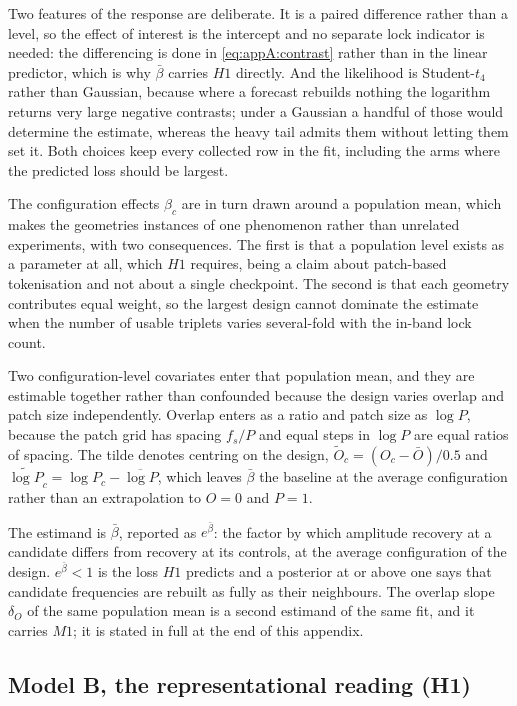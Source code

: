 Two features of the response are deliberate. It is a paired difference rather than a level, so the effect of interest is the intercept and no separate lock indicator is needed: the differencing is done in \autoref{eq:appA:contrast} rather than in the linear predictor, which is why $\bar\beta$ carries $H1$ directly. And the likelihood is Student-$t_4$ rather than Gaussian, because where a forecast rebuilds nothing the logarithm returns very large negative contrasts; under a Gaussian a handful of those would determine the estimate, whereas the heavy tail admits them without letting them set it. Both choices keep every collected row in the fit, including the arms where the predicted loss should be largest.

The configuration effects $\beta_c$ are in turn drawn around a population mean, which makes the geometries instances of one phenomenon rather than unrelated experiments, with two consequences. The first is that a population level exists as a parameter at all, which $H1$ requires, being a claim about patch-based tokenisation and not about a single checkpoint. The second is that each geometry contributes equal weight, so the largest design cannot dominate the estimate when the number of usable triplets varies several-fold with the in-band lock count.

Two configuration-level covariates enter that population mean, and they are estimable together rather than confounded because the design varies overlap and patch size independently. Overlap enters as a ratio and patch size as $\log P$, because the patch grid has spacing $f_s/P$ and equal steps in $\log P$ are equal ratios of spacing. The tilde denotes centring on the design, $\widetilde O_c=(O_c-\bar O)/0.5$ and $\widetilde{\log P}_c=\log P_c-\overline{\log P}$, which leaves $\bar\beta$ the baseline at the average configuration rather than an extrapolation to $O=0$ and $P=1$.

The estimand is $\bar\beta$, reported as $e^{\bar\beta}$: the factor by which amplitude recovery at a candidate differs from recovery at its controls, at the average configuration of the design. $e^{\bar\beta}<1$ is the loss $H1$ predicts and a posterior at or above one says that candidate frequencies are rebuilt as fully as their neighbours. The overlap slope $\delta_O$ of the same population mean is a second estimand of the same fit, and it carries $M1$; it is stated in full at the end of this appendix.

\subsection{Model B, the representational reading (H1)}

